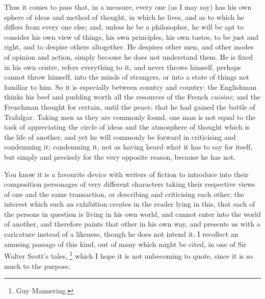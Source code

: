 Thus it comes to pass that, in a measure, every one
(as I may say) has his own sphere of ideas and method of
thought, in which he lives, and as to which he differs
from every one else; and, unless he be a philosopher, he
will be apt to consider his own view of things, his own
principles, his own tastes, to be just and right, and to
despise others altogether. He despises other men, and
other modes of opinion and action, simply because he does
not understand them. He is fixed in his own centre,
refers everything to it, and never throws himself,
perhaps cannot throw himself, into the minds of
strangers, or into a state of things not familiar to him.
So it is especially between country and country: the
Englishman thinks his beef and pudding worth all the
resources of the French \emph{cuisine}; and the
Frenchman thought for certain, until the peace, that he
had gained the battle of Trafalgar. Taking men as they
are commonly found, one man is not equal to the task of
appreciating the circle of ideas and the atmosphere of
thought which is the life of another; and yet he will
commonly be forward in criticising and condemning it;
condemning it, not as having heard what it has to say for
itself, but simply and precisely for the very opposite
reason, because he has not.

You know it is a favourite device with writers of
fiction to introduce into their composition personages of
very different characters taking their respective views
of one and the same transaction, or describing and
criticising each other; the interest which such an
exhibition creates in the reader lying in this, that each
of the persons in question is living in his own world,
and cannot enter into the world of another, and therefore
paints that other in his own way, and presents us with a
caricature instead of a likeness, though he does not
intend it. I recollect an amusing passage of this kind,
out of many which might be cited, in one of Sir Walter
Scott's tales, \footnote{Guy Mannering.} which I hope it is not
unbecoming to quote, since it is so much to the purpose.

